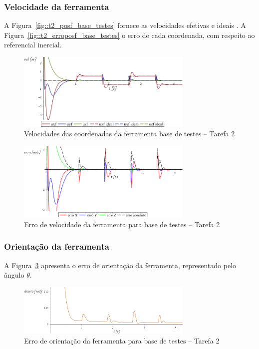 \subsubsection{Velocidade da ferramenta}

A Figura~\ref{fig::t2_posf_base_testes} fornece as velocidades
efetivas e ideais . A Figura~\ref{fig::t2_erroposf_base_testes} o erro de cada
coordenada, com respeito ao referencial inercial.

\begin{figure}[h!]
	\centering 
 	\includegraphics[width=0.75\textwidth]{figs/t2_velf_base_testes}
 	\caption{Velocidades das coordenadas da ferramenta base de testes --
 	Tarefa 2}
 	\label{fig::t2_velf_base_testes}
\end{figure}

\begin{figure}[h!]
	\centering 
 	\includegraphics[width=0.75\textwidth]{figs/t2_errovelf_base_testes}
 	\caption{Erro de velocidade da ferramenta para base de testes --
 	Tarefa 2}
 	\label{fig::t2_errovelf_base_testes}
\end{figure}


\subsubsection{Orientação da ferramenta}

A Figura~\ref{fig::t2_erroori_base_testes} apresenta o erro de orientação da
ferramenta, representado pelo ângulo $\theta$.

\begin{figure}[h!]
	\centering 
 	\includegraphics[width=0.75\textwidth]{figs/t2_erroori_base_testes}
 	\caption{Erro de orientação da ferramenta para base de testes -- Tarefa
 	2}
 	\label{fig::t2_erroori_base_testes}
\end{figure}


